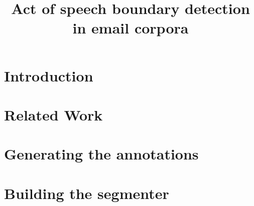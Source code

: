 \documentclass[11pt]{article}
\title{Act of speech boundary detection in email corpora}
\date{}
\author{}
\begin{document}
\maketitle

\begin{abstract}

\end{abstract}

\section{Introduction}
\label{intro}

%
% 
\blfootnote{
    \hspace{-0.65cm}  %
}

\section{Related Work}

\section{Generating the annotations}

\section{Building the segmenter}
\end{document}
